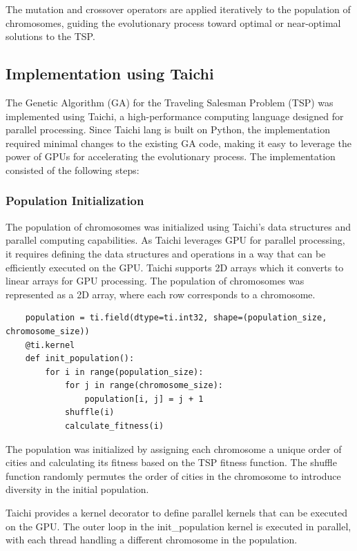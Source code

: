 \documentclass[conference]{IEEEtran}
\begin{document}
The mutation and crossover operators are applied iteratively to the population
of chromosomes, guiding the evolutionary process toward optimal or near-optimal
solutions to the TSP.

\subsection{Implementation using Taichi}
The Genetic Algorithm (GA) for the Traveling Salesman Problem (TSP) was
implemented using Taichi, a high-performance computing language designed for
parallel processing. Since Taichi lang is built on Python, the implementation
required minimal changes to the existing GA code, making it easy to leverage
the power of GPUs for accelerating the evolutionary process. The implementation
consisted of the following steps:

\subsubsection{Population Initialization}
The population of chromosomes was initialized using Taichi's data structures
and parallel computing capabilities. As Taichi leverages GPU for parallel
processing, it requires defining the data structures and operations in a way
that can be efficiently executed on the GPU. Taichi supports 2D arrays which it
converts to linear arrays for GPU processing. The population of chromosomes was
represented as a 2D array, where each row corresponds to a chromosome.

\begin{lstlisting}
    population = ti.field(dtype=ti.int32, shape=(population_size, chromosome_size))
    @ti.kernel
    def init_population():
        for i in range(population_size):
            for j in range(chromosome_size):
                population[i, j] = j + 1
            shuffle(i)
            calculate_fitness(i)
\end{lstlisting}

The population was initialized by assigning each chromosome a unique order of
cities and calculating its fitness based on the TSP fitness function. The
shuffle function randomly permutes the order of cities in the chromosome to
introduce diversity in the initial population.

Taichi provides a kernel decorator to define parallel kernels that can be
executed on the GPU. The outer loop in the init\_population kernel is executed
in parallel, with each thread handling a different chromosome in the
population.
\end{document}
